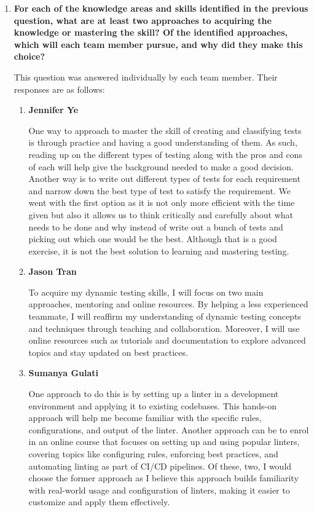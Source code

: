 \documentclass[12pt, titlepage]{article}
\begin{document}
\begin{enumerate}
  \smallskip
  \item \textbf{For each of the knowledge areas and skills identified in the previous
  question, what are at least two approaches to acquiring the knowledge or
  mastering the skill?  Of the identified approaches, which will each team
  member pursue, and why did they make this choice?}

    This question was answered individually by each team member. Their responses
    are as follows:
    \begin{enumerate}
      \item \textbf{Jennifer Ye}
        
        One way to approach to master the skill of creating and classifying
        tests is through practice and having a good understanding of them. As
        such, reading up on the different types of testing along with the pros
        and cons of each will help give the background needed to make a good
        decision. Another way is to write out different types of tests for each
        requirement and narrow down the best type of test to satisfy the
        requirement. We went with the first option as it is not only more
        efficient with the time given but also it allows us to think critically
        and carefully about what needs to be done and why instead of write out a
        bunch of tests and picking out which one would be the best. Although
        that is a good exercise, it is not the best solution to learning and
        mastering testing.

      \item \textbf{Jason Tran}
      
        To acquire my dynamic testing skills, I will focus on two main approaches,
        mentoring and online resources. By helping a less experienced teammate, I
        will reaffirm my understanding of dynamic testing concepts and techniques
        through teaching and collaboration. Moreover, I will use online resources
        such as tutorials and documentation to explore advanced topics and stay
        updated on best practices.

      \item \textbf{Sumanya Gulati}
      
        One approach to do this is by setting up a linter in a development
        environment and applying it to existing codebases. This hands-on approach
        will help me become familiar with the specific rules, configurations, and
        output of the linter. Another approach can be to enrol in an online course
        that focuses on setting up and using popular linters, covering topics like
        configuring rules, enforcing best practices, and automating linting as
        part of CI/CD pipelines. Of these, two, I would choose the former approach
        as I believe this approach builds familiarity with real-world usage and
        configuration of linters, making it easier to customize and apply them
        effectively.


\end{enumerate}
\end{enumerate}
\end{document}
